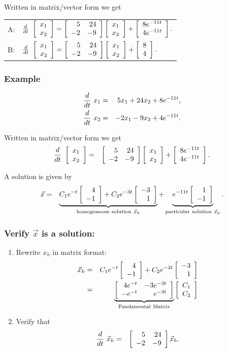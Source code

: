 {\begin{frame}
{   Written in matrix/vector form we get\\[12pt]

   \begin{tabular}{ll}
          A: &  $\deriv{~}{t} \vecTwo{x_1}{x_2}  =  
      \arrayTwo{5}{24}{-2}{-9} \vecTwo{x_1}{x_2}
      + \vecTwo{8e^{-11t}}{4e^{-11t}}.$
       \\[12pt]
          B: &  $\deriv{~}{t} \vecTwo{x_1}{x_2}  =  
      \arrayTwo{5}{24}{-2}{-9} \vecTwo{x_1}{x_2}
      + \vecTwo{8}{4}.$
       \\
    \end{tabular}


        \vfill
 }\fi
\end{frame}
}

\begin{frame}
  \frametitle{Example}

  \begin{eqnarray*}
    \deriv{~}{t} x_1 & = & 5  x_1 + 24 x_2 + 8 e^{-11t}, \\
    \deriv{~}{t} x_2 & = & -2 x_1 -  9 x_2 + 4 e^{-11t}.
  \end{eqnarray*}

  {
    Written in matrix/vector form we get
    \begin{eqnarray*}
      \deriv{~}{t} \vecTwo{x_1}{x_2} & = & 
      \arrayTwo{5}{24}{-2}{-9} \vecTwo{x_1}{x_2}
      + \vecTwo{8e^{-11t}}{4e^{-11t}}.
    \end{eqnarray*}
  }

  {
   A solution is given by
    \begin{eqnarray*}
      \vec{x} & = &  
      \underbrace{C_1 e^{-t} \vecTwo{4}{-1} + C_2 e^{-3t} \vecTwo{-3}{1}}_{\mathrm{homogeneous ~solution~} \vec{x}_h} 
      + \underbrace{ e^{-11t} \vecTwo{1}{-1}}_{\mathrm{particular~ solution}~ \vec{x}_p}.
    \end{eqnarray*}
  }
\end{frame}


\begin{frame}
  \frametitle{Verify $\vec{x}$ is a solution:}

  \begin{enumerate}
  \item Rewrite $x_h$ in matrix format: 
    \begin{eqnarray*}
      \vec{x}_h & = & C_1 e^{-t} \vecTwo{4}{-1} 
      + C_2 e^{-3t} \vecTwo{-3}{1}\\
      & = & 
      \underbrace{\arrayTwo{4e^{-t}}{-3e^{-3t}}{-e^{-t}}{e^{-3t}}}_{\mathrm{Fundamental~Matrix}}
      \vecTwo{C_1}{C_2} 
    \end{eqnarray*}
   
  \item Verify that  
    \begin{eqnarray*}
      \deriv{~}{t} \vec{x}_h & = & \arrayTwo{5}{24}{-2}{-9} \vec{x}_h.
    \end{eqnarray*}
 
  \end{enumerate}

\end{frame}

